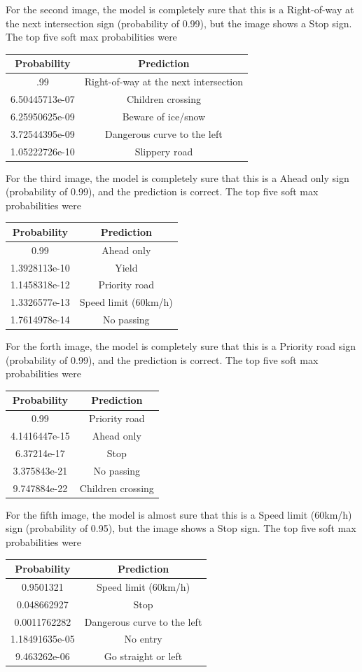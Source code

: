 \documentclass[11pt]{article}
\begin{document}
For the second image, the model is completely sure that this is a
Right-of-way at the next intersection sign (probability of 0.99), but
the image shows a Stop sign. The top five soft max probabilities were

\begin{longtable}[]{@{}cc@{}}
\toprule
Probability & Prediction\tabularnewline
\midrule
\endhead
.99 & Right-of-way at the next intersection\tabularnewline
6.50445713e-07 & Children crossing\tabularnewline
6.25950625e-09 & Beware of ice/snow\tabularnewline
3.72544395e-09 & Dangerous curve to the left\tabularnewline
1.05222726e-10 & Slippery road\tabularnewline
\bottomrule
\end{longtable}

For the third image, the model is completely sure that this is a Ahead
only sign (probability of 0.99), and the prediction is correct. The top
five soft max probabilities were

\begin{longtable}[]{@{}cc@{}}
\toprule
Probability & Prediction\tabularnewline
\midrule
\endhead
0.99 & Ahead only\tabularnewline
1.3928113e-10 & Yield\tabularnewline
1.1458318e-12 & Priority road\tabularnewline
1.3326577e-13 & Speed limit (60km/h)\tabularnewline
1.7614978e-14 & No passing\tabularnewline
\bottomrule
\end{longtable}

For the forth image, the model is completely sure that this is a
Priority road sign (probability of 0.99), and the prediction is correct.
The top five soft max probabilities were

\begin{longtable}[]{@{}cc@{}}
\toprule
Probability & Prediction\tabularnewline
\midrule
\endhead
0.99 & Priority road\tabularnewline
4.1416447e-15 & Ahead only\tabularnewline
6.37214e-17 & Stop\tabularnewline
3.375843e-21 & No passing\tabularnewline
9.747884e-22 & Children crossing\tabularnewline
\bottomrule
\end{longtable}

For the fifth image, the model is almost sure that this is a Speed limit
(60km/h) sign (probability of 0.95), but the image shows a Stop sign.
The top five soft max probabilities were

\begin{longtable}[]{@{}cc@{}}
\toprule
Probability & Prediction\tabularnewline
\midrule
\endhead
0.9501321 & Speed limit (60km/h)\tabularnewline
0.048662927 & Stop\tabularnewline
0.0011762282 & Dangerous curve to the left\tabularnewline
1.18491635e-05 & No entry\tabularnewline
9.463262e-06 & Go straight or left\tabularnewline
\bottomrule
\end{longtable}


    
    
    
    
\end{document}
